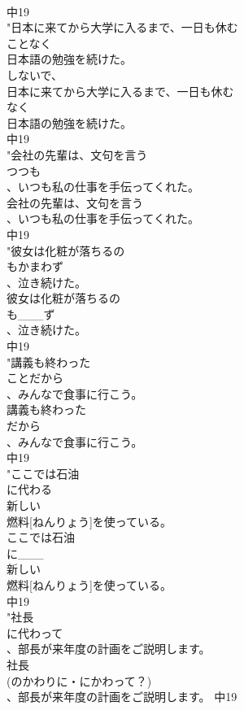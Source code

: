 \documentclass[8pt]{extreport}
\begin{document}
\begin{CJK}{UTF8}{min}
\\	中19
\\	"日本に来てから大学に入るまで、一日も休む
\\	ことなく
\\	日本語の勉強を続けた。
\\	しないで、 
\\	日本に来てから大学に入るまで、一日も休む
\\	なく
\\	日本語の勉強を続けた。
\\	中19
\\	"会社の先輩は、文句を言う
\\	つつも
\\	、いつも私の仕事を手伝ってくれた。
\\	会社の先輩は、文句を言う
\\	、いつも私の仕事を手伝ってくれた。
\\	中19
\\	"彼女は化粧が落ちるの
\\	もかまわず
\\	、泣き続けた。
\\	彼女は化粧が落ちるの
\\	も___ず
\\	、泣き続けた。
\\	中19
\\	"講義も終わった
\\	ことだから
\\	、みんなで食事に行こう。
\\	講義も終わった
\\	だから
\\	、みんなで食事に行こう。
\\	中19
\\	"ここでは石油
\\	に代わる
\\	新しい
\\	燃料[ねんりょう]を使っている。
\\	ここでは石油
\\	に___
\\	新しい
\\	燃料[ねんりょう]を使っている。
\\	中19
\\	"社長
\\	に代わって
\\	、部長が来年度の計画をご説明します。
\\	社長
\\	(のかわりに・にかわって？)
\\	、部長が来年度の計画をご説明します。			中19

\end{CJK}
\end{document}
